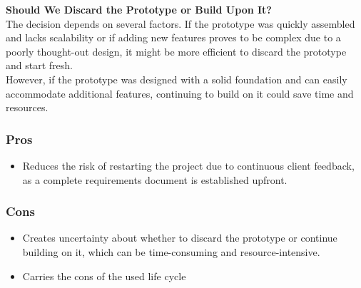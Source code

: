 \vspace{0.5cm}
\begin{tcolorbox}[title = Note]
    \textbf{Should We Discard the Prototype or Build Upon It?}\\

    The decision depends on several factors. If the prototype was quickly assembled and lacks scalability or if adding 
    new features proves to be complex due to a poorly thought-out design, it might be more efficient to discard the
    prototype and start fresh.\\

    However, if the prototype was designed with a solid foundation and can easily accommodate additional features,
    continuing to build on it could save time and resources.
\end{tcolorbox}
\vspace{1.5cm}
\begin{center}
\end{center}

\vspace{1cm}
\subsubsection{Pros}
\begin{itemize}
    \item Reduces the risk of restarting the project due to continuous client feedback, as a complete requirements
document is established upfront.
\end{itemize}

\subsubsection{Cons}
\begin{itemize}
    \item Creates uncertainty about whether to discard the prototype or continue building on it, which can be time-consuming 
and resource-intensive.
    \item Carries the cons of the used life cycle
\end{itemize}

